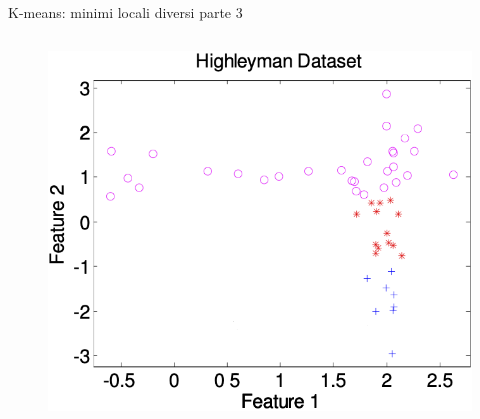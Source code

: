 \begin{frame}
\begin{block}{K-means: minimi locali diversi parte 3}
\begin{columns}
			\begin{figure}[!htbp]
				\centering
				\includegraphics[angle=0,width=1\linewidth]{images/unsupervised/kmeans/highley_3k_1.png}
			\end{figure}

		\end{columns}
	\end{block}

\end{frame}


